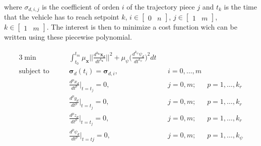 \noindent where $\sigma_{d,i,j}$ is the coefficient of orden $i$ of the trajectory piece $j$ and $t_k$ is the time that the vehicle has to reach setpoint $k$, $i \in \begin{bmatrix}0 & n\end{bmatrix}$, $j \in \begin{bmatrix}1 & m\end{bmatrix}$, $k \in \begin{bmatrix}1 & m\end{bmatrix}$. The interest is then to minimize a cost function wich can be written using these piecewise polynomial. 

\begin{alignat}{3}
	\min\qquad & \int_{t_0}^{t_m}\mu_{\mathbf{x}} \Bigg|\Bigg|\frac{d^{k_{\mathbf{x}}}\mathbf{x}_d}{dt^{k_{\mathbf{x}}}} \Bigg|\Bigg|^2 + \mu_{\psi}\Bigg(\frac{d^{k_{\psi}}\psi_d}{dt^{k_{\psi}}}\Bigg)^2dt \\
	\text{subject to}\qquad & \boldsymbol{\sigma}_d(t_i) = \boldsymbol{\sigma}_{d,i}, && i=0,\dots ,m \nonumber \\
	& \frac{d^px_d}{dt^p}\Big|_{t=t_j}=0, && j=0,m; & p=1,\dots ,k_r \nonumber \\
	& \frac{d^py_d}{dt^p}\Big|_{t=t_j}=0, && j=0,m; & p=1,\dots ,k_r \nonumber \\
	& \frac{d^pz_d}{dt^p}\Big|_{t=t_j}=0, && j=0,m; & p=1,\dots ,k_r \nonumber \\
	& \frac{d^p\psi_d}{dt^p}\Big|_{t=tj}=0, && j=0,m; & p=1,\dots ,k_{\psi} \nonumber
	\label{eq:minimizationCost}
\end{alignat}

